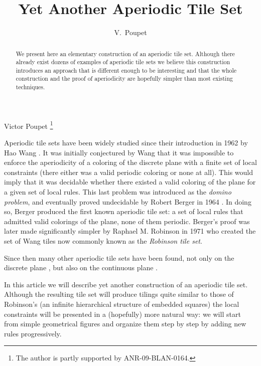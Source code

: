 \documentclass{jac}
\begin{document}
    
\title{Yet Another Aperiodic Tile Set}
\author {V.~Poupet}{Victor Poupet}
\thanks{The author is partly supported by ANR-09-BLAN-0164.}
\address {LIF Marseille}


\begin{abstract}
    \noindent We present here an elementary construction of an aperiodic tile set. Although there already exist dozens of examples of aperiodic tile sets we believe this construction introduces an approach that is different enough to be interesting and that the whole construction and the proof of aperiodicity are hopefully simpler than most existing techniques.
\end{abstract}

\maketitle

Aperiodic tile sets have been widely studied since their introduction in 1962 by Hao Wang \cite{KahrMooreWang62}. It was initially conjectured by Wang that it was impossible to enforce the aperiodicity of a coloring of the discrete plane  with a finite set of local constraints (there either was a valid periodic coloring or none at all). This would imply that it was decidable whether there existed a valid coloring of the plane for a given set of local rules. This last problem was introduced as the \emph{domino problem}, and eventually proved undecidable by Robert Berger in 1964 \cite{Berger64, Berger66}. In doing so, Berger produced the first known aperiodic tile set: a set of local rules that admitted valid colorings of the plane, none of them periodic. Berger's proof was later made significantly simpler by Raphael M. Robinson in 1971 \cite{Robinson71} who created the set of Wang tiles now commonly known as the \emph{Robinson tile set}.

Since then many other aperiodic tile sets have been found, not only on the discrete plane \cite{DurandLevinShen04, DurandShenRomashchenko08, Kari07, Ollinger08}, but also on the continuous plane \cite{Goodman-Strauss99, Penrose78}.

In this article we will describe yet another construction of an aperiodic tile set. Although the resulting tile set will produce tilings quite similar to those of Robinson's (an infinite hierarchical structure of embedded squares) the local constraints will be presented in a (hopefully) more natural way: we will start from simple geometrical figures and organize them step by step by adding new rules progressively.
\end{document}
